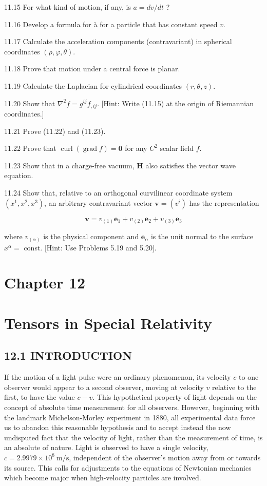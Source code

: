 \documentclass[10pt]{article}
\begin{document}
11.15 For what kind of motion, if any, is $a=d v / d t$ ?

11.16 Develop a formula for à for a particle that has constant speed $v$.

11.17 Calculate the acceleration components (contravariant) in spherical coordinates $(\rho, \varphi, \theta)$.

11.18 Prove that motion under a central force is planar.

11.19 Calculate the Laplacian for cylindrical coordinates $(r, \theta, z)$.

11.20 Show that $\nabla^{2} f=g^{i j} f_{, i j}$. [Hint: Write (11.15) at the origin of Riemannian coordinates.]

11.21 Prove (11.22) and (11.23).

11.22 Prove that $\operatorname{curl}(\operatorname{grad} f)=\mathbf{0}$ for any $C^{2}$ scalar field $f$.

11.23 Show that in a charge-free vacuum, $\mathbf{H}$ also satisfies the vector wave equation.

11.24 Show that, relative to an orthogonal curvilinear coordinate system $\left(x^{1}, x^{2}, x^{3}\right)$, an arbitrary contravariant vector $\mathbf{v}=\left(v^{i}\right)$ has the representation

$$
\mathbf{v}=v_{(1)} \mathbf{e}_{1}+v_{(2)} \mathbf{e}_{2}+v_{(3)} \mathbf{e}_{3}
$$

where $v_{(\alpha)}$ is the physical component and $\mathbf{e}_{\alpha}$ is the unit normal to the surface $x^{\alpha}=$ const. [Hint: Use Problems 5.19 and 5.20].

\section*{Chapter 12}
\section*{Tensors in Special Relativity}
\subsection*{12.1 INTRODUCTION}
If the motion of a light pulse were an ordinary phenomenon, its velocity $c$ to one observer would appear to a second observer, moving at velocity $v$ relative to the first, to have the value $c-v$. This hypothetical property of light depends on the concept of absolute time measurement for all observers. However, beginning with the landmark Michelson-Morley experiment in 1880, all experimental data force us to abandon this reasonable hypothesis and to accept instead the now undisputed fact that the velocity of light, rather than the measurement of time, is an absolute of nature. Light is observed to have a single velocity, $c=2.9979 \times 10^{8} \mathrm{~m} / \mathrm{s}$, independent of the observer's motion away from or towards its source. This calls for adjustments to the equations of Newtonian mechanics which become major when high-velocity particles are involved.
\end{document}
